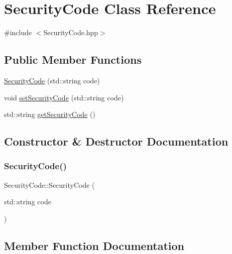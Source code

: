 \hypertarget{class_security_code}{}\section{Security\+Code Class Reference}
\label{class_security_code}


{\ttfamily \#include $<$Security\+Code.\+hpp$>$}

\subsection*{Public Member Functions}
\begin{DoxyCompactItemize}
\item 
\mbox{\hyperlink{class_security_code_acd92cad70c65fca9cad5d62e79474180}{Security\+Code}} (std\+::string code)
\item 
void \mbox{\hyperlink{class_security_code_a027077edcff7484b53def6ba4d94af01}{set\+Security\+Code}} (std\+::string code)
\item 
std\+::string \mbox{\hyperlink{class_security_code_aacb04fcdfb3960ebdaa33b7ba518fc83}{get\+Security\+Code}} ()
\end{DoxyCompactItemize}


\subsection{Constructor \& Destructor Documentation}
\mbox{\label{class_security_code_acd92cad70c65fca9cad5d62e79474180}} 
\subsubsection{\texorpdfstring{SecurityCode()}{SecurityCode()}}
{\footnotesize\ttfamily Security\+Code\+::\+Security\+Code (\begin{DoxyParamCaption}\item[{std\+::string}]{code }\end{DoxyParamCaption})}



\subsection{Member Function Documentation}
\mbox{\label{class_security_code_aacb04fcdfb3960ebdaa33b7ba518fc83}} 
